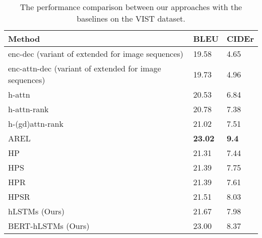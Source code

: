 \documentclass[a4paper,fleqn]{cas-sc}
\begin{document}
\begin{table}[tb]
\caption{The performance comparison between our approaches with the baselines on the VIST dataset.}\label{tbcomparison}
\begin{tabular*}{\tblwidth}{@{} LLL@{} }
\toprule
 \bf Method  & \bf BLEU & \bf CIDEr\\
\midrule
enc-dec (variant of \citet{Vinyals2014Show} extended for  image sequences)  &  19.58  & 4.65 \\
enc-attn-dec (variant of \citet{Xu2015Show} extended for  image sequences)  &  19.73 &  4.96 \\
h-attn \citep{Yulicheng2017}  &  20.53 &  6.84  \\
h-attn-rank \citep{Yulicheng2017}  &  20.78 &  7.38  \\
h-(gd)attn-rank \citep{Yulicheng2017}  &  21.02 &  7.51  \\
AREL \citep{wang-etal-2018-metrics} & \bf 23.02 & \bf 9.4  \\
HP \citep{wang2019}  &  21.31 &  7.44  \\
HPS \citep{wang2019}  &  21.39 &  7.75  \\
HPR \citep{wang2019}  &  21.39 &  7.61  \\
HPSR \citep{wang2019}  &  21.51 &  8.03  \\
\hline
hLSTMs (Ours) &  21.67 &  7.98  \\ 
BERT-hLSTMs (Ours) &  23.00 &  8.37  \\ 
\bottomrule
\end{tabular*}
\end{table}
\end{document}
